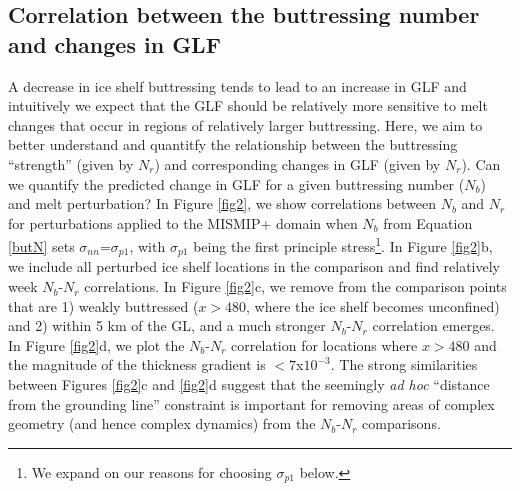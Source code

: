 \documentclass[review,oneside]{igs}
\begin{document}
\subsection{Correlation between the buttressing number and changes in GLF}

A decrease in ice shelf buttressing tends to lead to an increase in GLF \citep[e.g.,][]{gagliardini2010} and intuitively we expect that the GLF should be relatively more sensitive to melt changes that occur in regions of relatively larger buttressing. Here, we aim to better understand and quantitfy the relationship between the buttressing ``strength'' (given by $N_r$) and corresponding changes in GLF (given by $N_r$). Can we quantify the predicted change in GLF for a given buttressing number ($N_b$) and melt perturbation? In Figure \ref{fig2}, we show correlations between $N_b$ and $N_r$ for perturbations applied to the MISMIP+ domain when $N_b$ from Equation \ref{butN} sets $\sigma_{nn}$=$\sigma_{p1}$, with $\sigma_{p1}$ being the first principle stress\footnote{We expand on our reasons for choosing $\sigma_{p1}$ below.}. In Figure \ref{fig2}b, we include all perturbed ice shelf locations in the comparison and find relatively week $N_b$-$N_r$ correlations. In Figure \ref{fig2}c, we remove from the comparison points that are 1) weakly buttressed ($x>480$, where the ice shelf becomes unconfined) and 2) within 5 km of the GL, and a much stronger $N_b$-$N_r$ correlation emerges. In Figure \ref{fig2}d, we plot the $N_b$-$N_r$ correlation for locations where $x>480$ and the magnitude of the thickness gradient is $<7$x$10^{-3}$. The strong similarities between Figures \ref{fig2}c and \ref{fig2}d suggest that the seemingly \textit{ad hoc} ``distance from the grounding line'' constraint is important for removing areas of complex geometry (and hence complex dynamics) from the $N_b$-$N_r$ comparisons.

\end{document}
